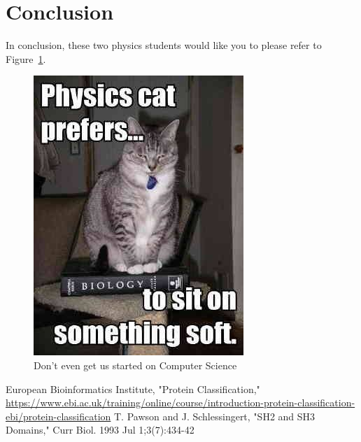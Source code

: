 \documentclass{article}
\begin{document}
\section*{Conclusion}

In conclusion, these two physics students would like you to please refer to Figure~\ref{fig:physcat}.

\begin{figure}[H]
\centering
\includegraphics{physicscat.jpg}
\caption{Don't even get us started on Computer Science}
\label{fig:physcat}
\end{figure}


\begin{thebibliography}{99}
 European Bioinformatics Institute, "Protein Classification," \url{https://www.ebi.ac.uk/training/online/course/introduction-protein-classification-ebi/protein-classification}
 T. Pawson and J. Schlessingert, "SH2 and SH3 Domains," Curr Biol. 1993 Jul 1;3(7):434-42
\end{thebibliography}
\end{document}
